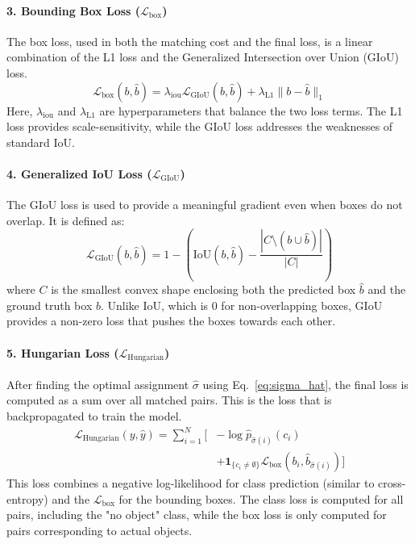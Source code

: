 \documentclass[10pt, conference]{IEEEtran}
\begin{document}
\paragraph{3. Bounding Box Loss ($\mathcal{L}_{\text{box}}$)}
The box loss, used in both the matching cost and the final loss, is a linear combination of the L1 loss and the Generalized Intersection over Union (GIoU) loss.
\begin{equation}
\mathcal{L}_{\text{box}}(b, \hat{b}) = \lambda_{\text{iou}}\mathcal{L}_{\text{GIoU}}(b, \hat{b}) + \lambda_{\text{L1}}\|b - \hat{b}\|_1
\label{eq:l_box}
\end{equation}
Here, $\lambda_{\text{iou}}$ and $\lambda_{\text{L1}}$ are hyperparameters that balance the two loss terms. The L1 loss provides scale-sensitivity, while the GIoU loss addresses the weaknesses of standard IoU.

\paragraph{4. Generalized IoU Loss ($\mathcal{L}_{\text{GIoU}}$)}
The GIoU loss is used to provide a meaningful gradient even when boxes do not overlap. It is defined as:
\begin{equation}
\mathcal{L}_{\text{GIoU}}(b, \hat{b}) = 1 - \left( \text{IoU}(b, \hat{b}) - \frac{|C \setminus (b \cup \hat{b})|}{|C|} \right)
\label{eq:l_giou}
\end{equation}
where $C$ is the smallest convex shape enclosing both the predicted box $\hat{b}$ and the ground truth box $b$. Unlike IoU, which is 0 for non-overlapping boxes, GIoU provides a non-zero loss that pushes the boxes towards each other.

\paragraph{5. Hungarian Loss ($\mathcal{L}_{\text{Hungarian}}$)}
After finding the optimal assignment $\hat{\sigma}$ using Eq.~\eqref{eq:sigma_hat}, the final loss is computed as a sum over all matched pairs. This is the loss that is backpropagated to train the model.
\begin{align}
\mathcal{L}_{\text{Hungarian}}(y, \hat{y}) = \sum_{i=1}^{N} \bigg[ &-\log \hat{p}_{\hat{\sigma}(i)}(c_i) \nonumber \\
& + \mathbf{1}_{\{c_i \neq \emptyset\}} \mathcal{L}_{\text{box}}(b_i, \hat{b}_{\hat{\sigma}(i)}) \bigg]
\label{eq:l_hungarian}
\end{align}
This loss combines a negative log-likelihood for class prediction (similar to cross-entropy) and the $\mathcal{L}_{\text{box}}$ for the bounding boxes. The class loss is computed for all pairs, including the "no object" class, while the box loss is only computed for pairs corresponding to actual objects.
\end{document}
